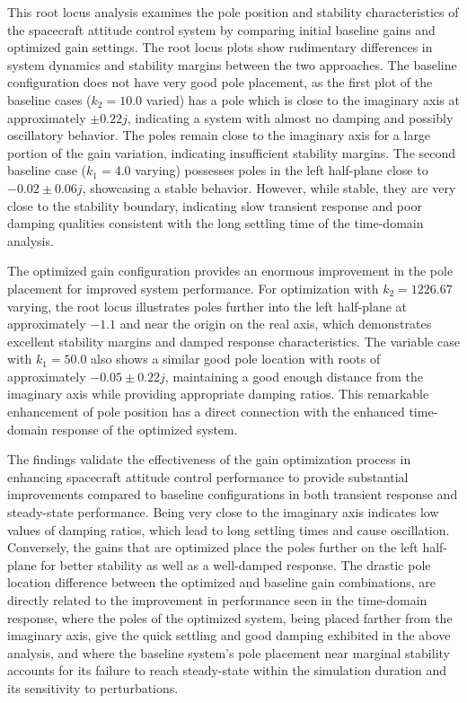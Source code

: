 \documentclass{ifacconf}
\begin{document}
This root locus analysis examines the pole position and stability characteristics of the spacecraft attitude control system by comparing initial baseline gains and optimized gain settings. The root locus plots show rudimentary differences in system dynamics and stability margins between the two approaches. The baseline configuration does not have very good pole placement, as the first plot of the baseline cases ($k_2 = 10.0$ varied) has a pole which is close to the imaginary axis at approximately $\pm 0.22j$, indicating a system with almost no damping and possibly oscillatory behavior. The poles remain close to the imaginary axis for a large portion of the gain variation, indicating insufficient stability margins. The second baseline case ($k_1 = 4.0$ varying) possesses poles in the left half-plane close to $-0.02 \pm 0.06j$, showcasing a stable behavior. However, while stable, they are very close to the stability boundary, indicating slow transient response and poor damping qualities consistent with the long settling time of the time-domain analysis.

The optimized gain configuration provides an enormous improvement in the pole placement for improved system performance. For optimization with $k_2 = 1226.67$ varying, the root locus illustrates poles further into the left half-plane at approximately $-1.1$ and near the origin on the real axis, which demonstrates excellent stability margins and damped response characteristics. The variable case with $k_1 = 50.0$ also shows a similar good pole location with roots of approximately $-0.05 \pm 0.22j$, maintaining a good enough distance from the imaginary axis while providing appropriate damping ratios. This remarkable enhancement of pole position has a direct connection with the enhanced time-domain response of the optimized system.

 The findings validate the effectiveness of the gain optimization process in enhancing spacecraft attitude control performance to provide substantial improvements compared to baseline configurations in both transient response and steady-state performance. Being very close to the imaginary axis indicates low values of damping ratios, which lead to long settling times and cause oscillation. Conversely, the gains that are optimized place the poles further on the left half-plane for better stability as well as a well-damped response. The drastic pole location difference between the optimized and baseline gain combinations, are directly related to the improvement in performance seen in the time-domain response, where the poles of the optimized system, being placed farther from the imaginary axis, give the quick settling and good damping exhibited in the above analysis, and where the baseline system's pole placement near marginal stability accounts for its failure to reach steady-state within the simulation duration and its sensitivity to perturbations.
\end{document}
